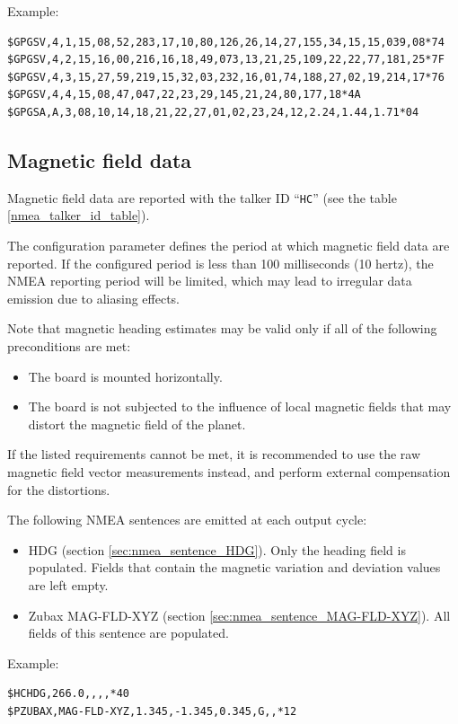 \documentclass{zubaxdoc}
\begin{document}
Example:
\begin{verbatim}
$GPGSV,4,1,15,08,52,283,17,10,80,126,26,14,27,155,34,15,15,039,08*74
$GPGSV,4,2,15,16,00,216,16,18,49,073,13,21,25,109,22,22,77,181,25*7F
$GPGSV,4,3,15,27,59,219,15,32,03,232,16,01,74,188,27,02,19,214,17*76
$GPGSV,4,4,15,08,47,047,22,23,29,145,21,24,80,177,18*4A
$GPGSA,A,3,08,10,14,18,21,22,27,01,02,23,24,12,2.24,1.44,1.71*04
\end{verbatim}

\subsection{Magnetic field data}

Magnetic field data are reported with the talker ID ``\verb|HC|'' (see the table \ref{nmea_talker_id_table}).

The configuration parameter  defines the period at which magnetic field data are reported.
If the configured period is less than 100 milliseconds (10 hertz),
the NMEA reporting period will be limited,
which may lead to irregular data emission due to aliasing effects.

Note that magnetic heading estimates may be valid only if all of the following preconditions are met:
\begin{itemize}
    \item The board is mounted horizontally.
    \item The board is not subjected to the influence of local magnetic fields that may distort the magnetic field
          of the planet.
\end{itemize}
If the listed requirements cannot be met, it is recommended to use the raw magnetic field vector measurements instead,
and perform external compensation for the distortions.

The following NMEA sentences are emitted at each output cycle:
\begin{itemize}
    \item HDG (section \ref{sec:nmea_sentence_HDG}). Only the heading field is populated.
          Fields that contain the magnetic variation and deviation values are left empty.
    \item Zubax MAG-FLD-XYZ (section \ref{sec:nmea_sentence_MAG-FLD-XYZ}).
          All fields of this sentence are populated.
\end{itemize}

Example:
\begin{verbatim}
$HCHDG,266.0,,,,*40
$PZUBAX,MAG-FLD-XYZ,1.345,-1.345,0.345,G,,*12
\end{verbatim}
\end{document}
